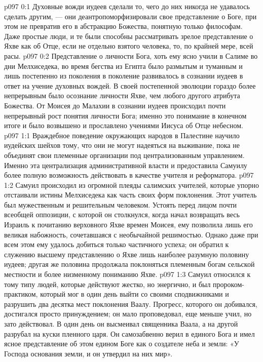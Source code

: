 \author{Мелхиседек}
\vs p097 0:1 Духовные вожди иудеев сделали то, чего до них никогда не удавалось сделать другим, --- они деантропоморфизировали свое представление о Боге, при этом не превратив его в абстракцию Божества, понятную только философам. Даже простые люди, и те были способны рассматривать зрелое представление о Яхве как об Отце, если не отдельно взятого человека, то, по крайней мере, всей расы.
\vs p097 0:2 Представление о личности Бога, хоть ему ясно учили в Салиме во дни Мелхиседека, во время бегства из Египта было размытым и туманным и лишь постепенно из поколения в поколение развивалось в сознании иудеев в ответ на учение духовных вождей. В своей постепенной эволюции гораздо более непрерывным было осознание личности Яхве, чем любого другого атрибута Божества. От Моисея до Малахии в сознании иудеев происходил почти непрерывный рост понятия личности Бога; именно это понимание в конечном итоге и было возвышено и прославлено учениями Иисуса об Отце небесном.
\vs p097 1:1 Враждебное поведение окружающих народов в Палестине научило иудейских шейхов тому, что они не могут надеяться на выживание, пока не объединят свои племенные организации под централизованным управлением. Именно эта централизация административной власти и предоставила Самуилу более полную возможность действовать в качестве учителя и реформатора.
\vs p097 1:2 Самуил происходил из огромной плеяды салимских учителей, которые упорно отстаивали истины Мелхиседека как часть своих форм поклонения. Этот учитель был мужественным и решительным человеком. Устоять перед лицом почти всеобщей оппозиции, с которой он столкнулся, когда начал возвращать весь Израиль к почитанию верховного Яхве времен Моисея, ему позволила лишь его великая набожность, сочетавшаяся с необычайной решимостью. Однако даже при всем этом ему удалось добиться только частичного успеха; он обратил к служению высшему представлению о Яхве лишь наиболее разумную половину иудеев; другая же половина продолжала поклоняться племенным богам сельской местности и более низменному пониманию Яхве.
\vs p097 1:3 Самуил относился к тому типу людей, которые действуют жестко, но энергично, и был пророком\hyp{}практиком, который мог в один день выйти со своими сподвижниками и разрушить два десятка мест поклонения Ваалу. Прогресс, которого он добивался, достигался просто принуждением; он мало проповедовал, еще меньше учил, но зато действовал. В один день он высмеивал священника Ваала, а на другой разрубал на куски пленного царя. Он самозабвенно верил в единого Бога и имел ясное представление об этом едином Боге как о создателе неба и земли: «У Господа основания земли, и он утвердил на них мир».
